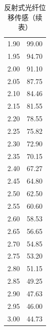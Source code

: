 \documentclass[a4paper]{article}%
\begin{document}
\begin{table}[H]
\begin{minipage}{0.2\linewidth}
\begin{tabular}{cc}
      1.90 	&	99.00 	\\
      1.95 	&	94.70 	\\
      2.00 	&	91.10 	\\
      2.05 	&	87.75 	\\
      2.10 	&	84.46 	\\
      2.15 	&	81.55 	\\
      2.20 	&	78.55 	\\
      2.25 	&	75.82 	\\
      2.30 	&	72.90 	\\
      2.35 	&	70.15 	\\
      2.40 	&	67.27 	\\
      2.45 	&	64.80 	\\
      2.50 	&	62.50 	\\
      2.55 	&	60.60 	\\
      2.60 	&	58.53 	\\
      2.65 	&	56.65 	\\
      2.70 	&	54.85 	\\
      2.75 	&	53.20 	\\
      2.80 	&	51.15 	\\
      2.85 	&	49.25 	\\
      2.90 	&	47.63 	\\
      2.95 	&	46.00 	\\
      3.00 	&	44.73 	\\
      \bottomrule
  \end{tabular}
  \caption*{反射式光纤位移传感（续表）}
\end{minipage}
\end{table}
\end{document}
